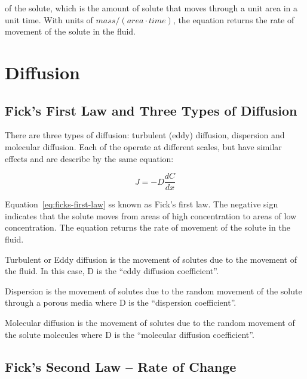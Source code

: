 \documentclass{tufte-handout}\usepackage[]{graphicx}\usepackage[]{xcolor}
\newenvironment{description*}%
  {\begin{description}%
    \setlength{\itemsep}{0pt}%
    \setlength{\parskip}{0pt}}%
  {\end{description}}
\begin{document}
of the solute, which is the amount of solute that moves through a unit area in a unit time. With units of $mass / (area \cdot time)$, the equation returns the rate of movement of the solute in the fluid.

\section{Diffusion}

\subsection{Fick's First Law and Three Types of Diffusion}

There are three types of diffusion: turbulent (eddy) diffusion, dispersion and molecular diffusion. Each of the operate at different scales, but have similar effects and are describe by the same equation:

\begin{equation}\label{eq:ficks-first-law}
  J = -D \frac{d C}{dx}
\end{equation}

Equation~\ref{eq:ficks-first-law} ss known as Fick's first law. The negative sign indicates that the solute moves from areas of high concentration to areas of low concentration. The equation returns the rate of movement of the solute in the fluid.

\begin{description*}

\item[Turbulent or Eddy diffusion] is the movement of solutes due to the movement of the fluid. In this case, D is the ``eddy diffusion coefficient''.

\item[Dispersion] is the movement of solutes due to the random movement of the solute through a porous media where D is the ``dispersion coefficient''.

\item[Molecular diffusion] is the movement of solutes due to the random movement of the solute molecules where D is the ``molecular diffusion coefficient''.

\end{description*}

\subsection{Fick's Second Law -- Rate of Change}
\end{document}
